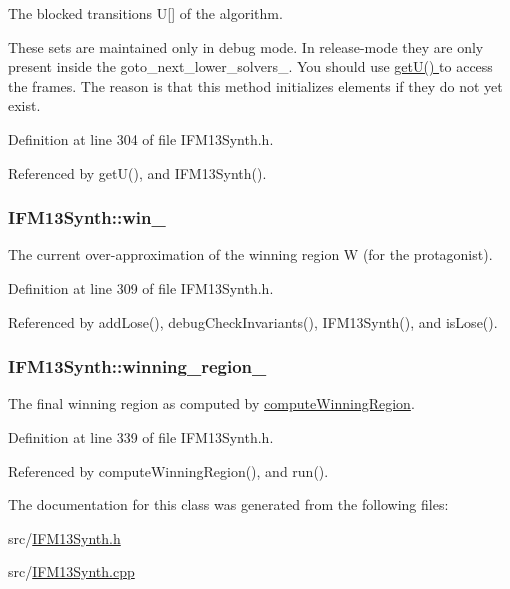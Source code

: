 The blocked transitions U\mbox{[}\mbox{]} of the algorithm. 

These sets are maintained only in debug mode. In release-\/mode they are only present inside the goto\-\_\-next\-\_\-lower\-\_\-solvers\-\_\-. You should use \hyperlink{classIFM13Synth_a396e520b9db59b73a46a2315ee3123b4}{get\-U() } to access the frames. The reason is that this method initializes elements if they do not yet exist. 

Definition at line 304 of file I\-F\-M13\-Synth.\-h.



Referenced by get\-U(), and I\-F\-M13\-Synth().

\hypertarget{classIFM13Synth_ab6b54169dc042466704a4e6ceee4e94d}{
\subsubsection[{win\-\_\-}]{ I\-F\-M13\-Synth\-::win\-\_\-\hspace{0.3cm}{\ttfamily [protected]}}}\label{classIFM13Synth_ab6b54169dc042466704a4e6ceee4e94d}


The current over-\/approximation of the winning region W (for the protagonist). 



Definition at line 309 of file I\-F\-M13\-Synth.\-h.



Referenced by add\-Lose(), debug\-Check\-Invariants(), I\-F\-M13\-Synth(), and is\-Lose().

\hypertarget{classIFM13Synth_a9b05f84db78c1ac1a2a8f74212f66c64}{
\subsubsection[{winning\-\_\-region\-\_\-}]{ I\-F\-M13\-Synth\-::winning\-\_\-region\-\_\-\hspace{0.3cm}{\ttfamily [protected]}}}\label{classIFM13Synth_a9b05f84db78c1ac1a2a8f74212f66c64}


The final winning region as computed by \hyperlink{classIFM13Synth_a51c6831265e1daf7d0120c0dd954a0c4}{compute\-Winning\-Region}. 



Definition at line 339 of file I\-F\-M13\-Synth.\-h.



Referenced by compute\-Winning\-Region(), and run().



The documentation for this class was generated from the following files\-:\begin{DoxyCompactItemize}
\item 
src/\hyperlink{IFM13Synth_8h}{I\-F\-M13\-Synth.\-h}\item 
src/\hyperlink{IFM13Synth_8cpp}{I\-F\-M13\-Synth.\-cpp}\end{DoxyCompactItemize}
